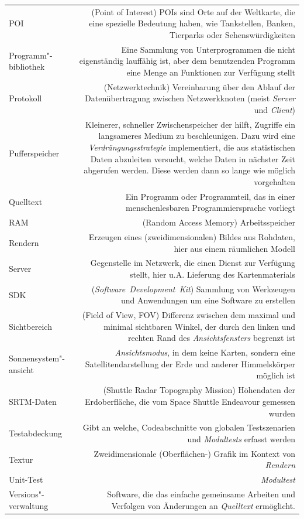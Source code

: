 \documentclass[10pt]{scrreprt}
\newcommand{\textref}[1]{\mbox{\raisebox{0.1ex}{\small$\rightarrow$ }\textit{#1}}}
\begin{document}
\begin{longtabu}{L{0.35} R{1.65}}
POI & (Point of Interest) POIs sind Orte auf der Weltkarte, die eine spezielle Bedeutung haben, wie Tankstellen, Banken, Tierparks oder Sehenswürdigkeiten\\
Programm"-bibliothek & Eine Sammlung von Unterprogrammen die nicht eigenständig lauffähig ist, aber dem benutzenden Programm eine Menge an Funktionen zur Verfügung stellt\\
Protokoll & (Netzwerktechnik) Vereinbarung über den Ablauf der Datenübertragung zwischen Netzwerkknoten (meist \textref{Server} und \textref{Client})\\
Pufferspeicher & Kleinerer, schneller Zwischenspeicher der hilft, Zugriffe ein langsameres Medium zu beschleunigen. Dazu wird eine \textit{Verdrängungsstrategie} implementiert, die aus statistischen Daten abzuleiten versucht, welche Daten in nächster Zeit abgerufen werden. Diese werden dann so lange wie möglich vorgehalten\\
Quelltext & Ein Programm oder Programmteil, das in einer menschenlesbaren Programmiersprache vorliegt\\
RAM & (Random Access Memory) Arbeitsspeicher\\
Rendern & Erzeugen eines (zweidimensionalen) Bildes aus Rohdaten, hier aus einem räumlichen Modell\\
Server & Gegenstelle im Netzwerk, die einen Dienst zur Verfügung stellt, hier u.A. Lieferung des Kartenmaterials\\
SDK & (\textref{Software Development Kit}) Sammlung von Werkzeugen und Anwendungen um eine Software zu erstellen\\
Sichtbereich & (Field of View, FOV) Differenz zwischen dem maximal und minimal sichtbaren Winkel, der durch den linken und rechten Rand des \textref{Ansichtsfensters} begrenzt ist\\
Sonnensystem"-ansicht & \textref{Ansichtsmodus}, in dem keine Karten, sondern eine Satellitendarstellung der Erde und anderer Himmelskörper möglich ist\\
SRTM-Daten & (Shuttle Radar Topography Mission) Höhendaten der Erdoberfläche, die vom Space Shuttle Endeavour gemessen wurden\\
Testabdeckung & Gibt an welche, Codeabschnitte von globalen Testszenarien und \textref{Modultests} erfasst werden \\
Textur & Zweidimensionale (Oberflächen-) Grafik im Kontext von \textref{Rendern}\\
Unit-Test & \textref{Modultest}\\
Versions"-verwaltung & Software, die das einfache gemeinsame Arbeiten und Verfolgen von Änderungen an \textref{Quelltext} ermöglicht.\\

\end{longtabu}
\end{document}
